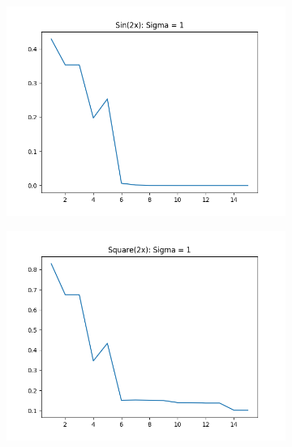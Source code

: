 \documentclass{article}
\begin{document}
\begin{figure}[ht!]
    \centering
    \begin{subfigure}[t]{0.4\textwidth}
        \centering
        \includegraphics[width=1\textwidth]{plots/batch/batch_error_sin2x.png}
        \caption{}
    \end{subfigure}
    \begin{subfigure}[t]{0.4\textwidth}
        \centering
        \includegraphics[width=1\textwidth]{plots/batch/batch_error_square2x.png}
        \caption{}
    \end{subfigure}
    \begin{subfigure}[t]{0.4\textwidth}
        \centering

\end{subfigure}
\end{figure}
\end{document}
